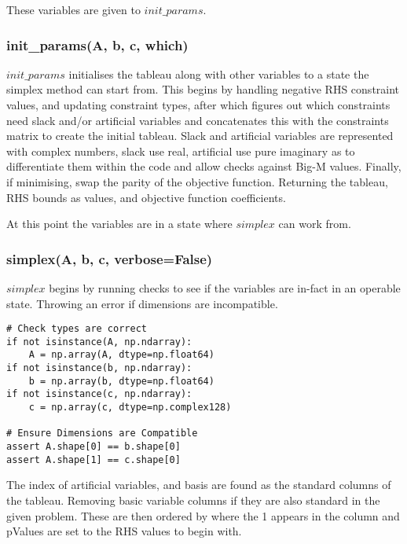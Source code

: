 \documentclass[letterpaper, a4paper]{article}
\begin{document}
These variables are given to $init\_params$.

\subsubsection{init\_params(A, b, c, which)}

$init\_params$ initialises the tableau along with other variables to a state the simplex method can start from. This begins by handling negative RHS constraint values, and updating constraint types, after which figures out which constraints need slack and/or artificial variables and concatenates this with the constraints matrix to create the initial tableau. Slack and artificial variables are represented with complex numbers, slack use real, artificial use pure imaginary as to differentiate them within the code and allow checks against Big-M values. Finally, if minimising, swap the parity of the objective function.
Returning the tableau, RHS bounds as values, and objective function coefficients.
\newline

At this point the variables are in a state where $simplex$ can work from.

\subsubsection{simplex(A, b, c, verbose=False)}
$simplex$ begins by running checks to see if the variables are in-fact in an operable state. Throwing an error if dimensions are incompatible.

\begingroup
\fontsize{8}{10}\selectfont
\begin{verbatim}
# Check types are correct
if not isinstance(A, np.ndarray):
    A = np.array(A, dtype=np.float64)
if not isinstance(b, np.ndarray):
    b = np.array(b, dtype=np.float64)
if not isinstance(c, np.ndarray):
    c = np.array(c, dtype=np.complex128)

# Ensure Dimensions are Compatible
assert A.shape[0] == b.shape[0]
assert A.shape[1] == c.shape[0]

\end{verbatim}
\endgroup


The index of artificial variables, and basis are found as the standard columns of the tableau. Removing basic variable columns if they are also standard in the given problem. These are then ordered by where the 1 appears in the column and pValues are set to the RHS values to begin with. 
\end{document}
